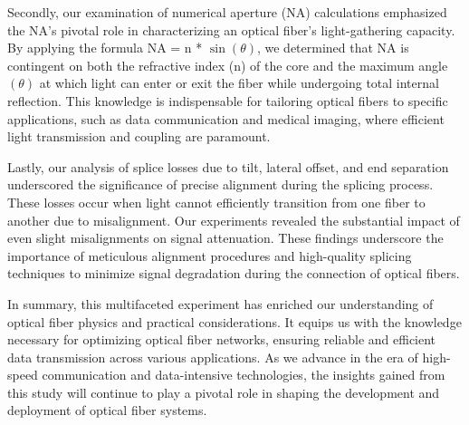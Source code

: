 \begin{itemize}
Secondly, our examination of numerical aperture (NA) calculations emphasized the NA's pivotal role in characterizing an optical fiber's light-gathering capacity. By applying the formula NA = n * $\sin(\theta)$, we determined that NA is contingent on both the refractive index (n) of the core and the maximum angle $(\theta)$ at which light can enter or exit the fiber while undergoing total internal reflection. This knowledge is indispensable for tailoring optical fibers to specific applications, such as data communication and medical imaging, where efficient light transmission and coupling are paramount.

Lastly, our analysis of splice losses due to tilt, lateral offset, and end separation underscored the significance of precise alignment during the splicing process. These losses occur when light cannot efficiently transition from one fiber to another due to misalignment. Our experiments revealed the substantial impact of even slight misalignments on signal attenuation. These findings underscore the importance of meticulous alignment procedures and high-quality splicing techniques to minimize signal degradation during the connection of optical fibers.

In summary, this multifaceted experiment has enriched our understanding of optical fiber physics and practical considerations. It equips us with the knowledge necessary for optimizing optical fiber networks, ensuring reliable and efficient data transmission across various applications. As we advance in the era of high-speed communication and data-intensive technologies, the insights gained from this study will continue to play a pivotal role in shaping the development and deployment of optical fiber systems.
\end{itemize}
